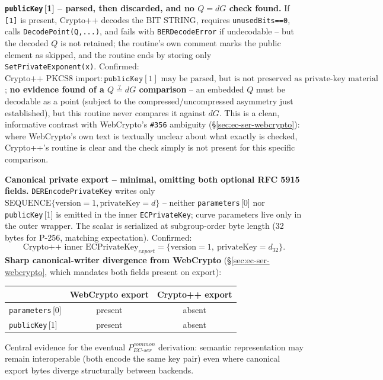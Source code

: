 \documentclass[11pt,a4paper]{article}
\begin{document}
\textbf{\texttt{publicKey}\,[1] -- parsed, then discarded, and no $Q=dG$ check found.} If \texttt{[1]} is present, Crypto++ decodes the BIT STRING, requires \texttt{unusedBits==0}, calls \texttt{DecodePoint(Q,...)}, and fails with \texttt{BERDecodeError} if undecodable -- but the decoded $Q$ is not retained; the routine's own comment marks the public element as skipped, and the routine ends by storing only \texttt{SetPrivateExponent(x)}. Confirmed: $\text{Crypto++ PKCS8 import}: \texttt{publicKey}[1] \text{ may be parsed, but is not preserved as private-key material}$; \textbf{no evidence found of a $Q\overset{?}{=}dG$ comparison} -- an embedded $Q$ must be decodable as a point (subject to the compressed/uncompressed asymmetry just established), but this routine never compares it against $dG$. This is a clean, informative contrast with WebCrypto's \texttt{\#356} ambiguity (\S\ref{sec:ec-ser-webcrypto}): where WebCrypto's own text is textually unclear about what exactly is checked, Crypto++'s routine is clear and the check simply is not present for this specific comparison.

\textbf{Canonical private export -- minimal, omitting both optional RFC 5915 fields.} \texttt{DEREncodePrivateKey} writes only $\text{SEQUENCE}\{\text{version}=1, \text{privateKey}=d\}$ -- neither \texttt{parameters}\,[0] nor \texttt{publicKey}\,[1] is emitted in the inner \texttt{ECPrivateKey}; curve parameters live only in the outer wrapper. The scalar is serialized at subgroup-order byte length (32 bytes for P-256, matching expectation). Confirmed:
\[
\text{Crypto++ inner ECPrivateKey}_{export} = \{\text{version}=1,\ \text{privateKey}=d_{32}\}.
\]
\textbf{Sharp canonical-writer divergence from WebCrypto} (\S\ref{sec:ec-ser-webcrypto}, which mandates both fields present on export):
\begin{center}
\begin{tabular}{@{}lcc@{}}
\toprule
& WebCrypto export & Crypto++ export \\
\midrule
\texttt{parameters}\,[0] & present & absent \\
\texttt{publicKey}\,[1] & present & absent \\
\bottomrule
\end{tabular}
\end{center}
Central evidence for the eventual $P_{EC\text{-}ser}^{common}$ derivation: semantic representation may remain interoperable (both encode the same key pair) even where canonical export bytes diverge structurally between backends.
\end{document}
